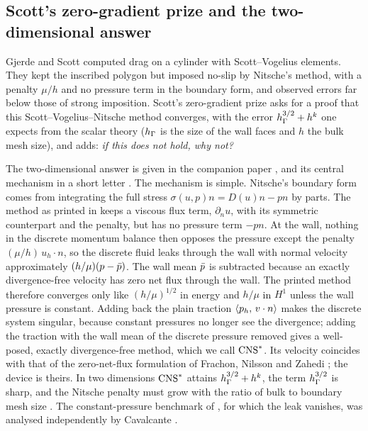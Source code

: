 \subsection{Scott's zero-gradient prize and the two-dimensional answer}
Gjerde and Scott \cite{GjerdeScott2024} computed drag on a cylinder with Scott--Vogelius elements. They kept the inscribed polygon but imposed no-slip by Nitsche's method, with a penalty $\mu/h$ and no pressure term in the boundary form, and observed errors far below those of strong imposition. Scott's zero-gradient prize \cite{ScottPrize} asks for a proof that this Scott--Vogelius--Nitsche method converges, with the error $h_\Gamma^{3/2}+h^k$ one expects from the scalar theory ($h_\Gamma$ is the size of the wall faces and $h$ the bulk mesh size), and adds: \emph{if this does not hold, why not?}

The two-dimensional answer is given in the companion paper \cite{PadhiLong2D}, and its central mechanism in a short letter \cite{CavalcantePadhi2026}. The mechanism is simple. Nitsche's boundary form comes from integrating the full stress $\sigma(u,p)n=D(u)n-pn$ by parts. The method as printed in \cite[(27)--(28)]{GjerdeScott2024} keeps a viscous flux term, $\partial_nu$, with its symmetric counterpart and the penalty, but has no pressure term $-pn$. At the wall, nothing in the discrete momentum balance then opposes the pressure except the penalty $(\mu/h)\,u_h\cdot n$, so the discrete fluid leaks through the wall with normal velocity approximately $(h/\mu)(p-\bar p)$. The wall mean $\bar p$ is subtracted because an exactly divergence-free velocity has zero net flux through the wall. The printed method therefore converges only like $(h/\mu)^{1/2}$ in energy and $h/\mu$ in $H^1$ unless the wall pressure is constant. Adding back the plain traction $\langle p_h,\, v\cdot n\rangle$ makes the discrete system singular, because constant pressures no longer see the divergence; adding the traction with the wall mean of the discrete pressure removed gives a well-posed, exactly divergence-free method, which we call $\mathrm{CNS}^\ast$. Its velocity coincides with that of the zero-net-flux formulation of Frachon, Nilsson and Zahedi \cite{FrachonNilssonZahedi2024}; the device is theirs. In two dimensions $\mathrm{CNS}^\ast$ attains $h_\Gamma^{3/2}+h^k$, the term $h_\Gamma^{3/2}$ is sharp, and the Nitsche penalty must grow with the ratio of bulk to boundary mesh size \cite{PadhiLong2D}. The constant-pressure benchmark of \cite{GjerdeScott2024,ScottPrize}, for which the leak vanishes, was analysed independently by Cavalcante \cite{Cavalcante}.

